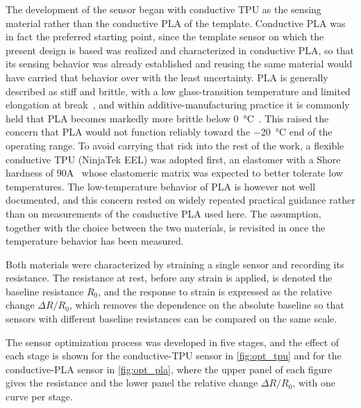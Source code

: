 The development of the sensor began with conductive TPU as the sensing material rather than the conductive PLA of the template. Conductive PLA was in fact the preferred starting point, since the template sensor on which the present design is based was realized and characterized in conductive PLA, so that its sensing behavior was already established and reusing the same material would have carried that behavior over with the least uncertainty. PLA is generally described as stiff and brittle, with a low glass-transition temperature and limited elongation at break~\cite{Farah2016,protopasta_conductive_pla}, and within additive-manufacturing practice it is commonly held that PLA becomes markedly more brittle below \SI{0}{\celsius}~\cite{PLAlowtemp}. This raised the concern that PLA would not function reliably toward the \SI{-20}{\celsius} end of the operating range. To avoid carrying that risk into the rest of the work, a flexible conductive TPU (NinjaTek EEL) was adopted first, an elastomer with a Shore hardness of 90A~\cite{ninjatek_ninjaflex_2026} whose elastomeric matrix was expected to better tolerate low temperatures. The low-temperature behavior of PLA is however not well documented, and this concern rested on widely repeated practical guidance rather than on measurements of the conductive PLA used here. The assumption, together with the choice between the two materials, is revisited in  once the temperature behavior has been measured.

Both materials were characterized by straining a single sensor and recording its resistance. The resistance at rest, before any strain is applied, is denoted the baseline resistance $R_0$, and the response to strain is expressed as the relative change $\Delta R / R_0$, which removes the dependence on the absolute baseline so that sensors with different baseline resistances can be compared on the same scale.

The sensor optimization process was developed in five stages, and the effect of each stage is shown for the conductive-TPU sensor in \cref{fig:opt_tpu} and for the conductive-PLA sensor in \cref{fig:opt_pla}, where the upper panel of each figure gives the resistance and the lower panel the relative change $\Delta R / R_0$, with one curve per stage.

